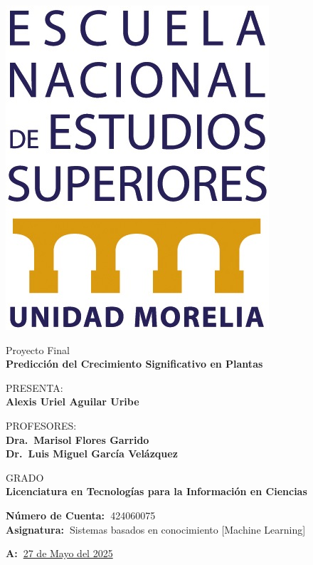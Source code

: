 \documentclass[12pt,a4paper]{article}
\begin{document}
\begin{titlepage}
\begin{minipage}[c]{0.1\textwidth}
            \includegraphics[width=\textwidth]{./Resources/logo_enes.jpg}
        \end{minipage}
        \vspace{3cm}

        \centering

        {\large{Proyecto Final\\}}
        {\Large\textbf{Predicción del Crecimiento Significativo en Plantas}}
        \vspace{2cm}

        {{PRESENTA:\\}}
        {\large\textbf{Alexis Uriel Aguilar Uribe}}
        \vspace{1cm} 

        {{PROFESORES:\\}}
        {\large\textbf{Dra.\ Marisol Flores Garrido}}\\
        {\large\textbf{Dr.\ Luis Miguel García Velázquez}}
        \vspace{2cm}

        {{GRADO\\}}
        {\large\textbf{Licenciatura en Tecnologías para la Información en Ciencias}}
        \vspace{2cm}

        \flushleft
        {\textbf{Número de Cuenta:\ }424060075}\\
        {\textbf{Asignatura:\ }Sistemas basados en conocimiento [Machine Learning]}
        \vspace{2cm}

        \flushright
        {\textbf{A:\ }\underline{27 de Mayo del 2025}}
        \vfill

    \end{titlepage}
\end{document}
